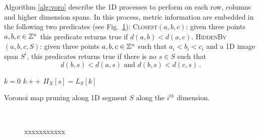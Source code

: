 \documentclass{llncs}
\begin{document}
Algorithm \ref{alg:voro} describe the 1D processes to perform on each
row, columns and higher dimension spans. In this process, metric
information are embedded in the following two predicates (see Fig.~\ref{fig:predicates}):
\textsc{Closest}$(a, b, c)$: given three points $a,b,c\in{\mathbb{Z}}^n$ this
predicate returns true if $d(a,b) < d(a,c)$. \textsc{HiddenBy}$(a, b,
c, S)$: given three points $a,b,c\in{\mathbb{Z}}^n$ such that $a_i<b_i<c_i$ and
a 1D image span $S^i$, this predicates returns true if there is no
$s\in S$ such that
    \begin{equation}
      d(b,s) < d(a,s)\text{ and }  d(b,s) < d(c,s)\,.
    \end{equation}
\begin{algorithm}[H]\footnotesize
{ $k=0$\;
}
  {
          {
            $k++$\;
          }
    $\Pi_X[s] = L_S[k]$\;
  }

  \caption{Voronoi map pruning along 1D segment $S$ along the $i^{th}$
    dimension.\label{alg:voro}}
\end{algorithm}
\begin{figure}
  \begin{center}
    ~~~~~~~~~~
  \end{center}
  \caption{xxxxxxxxxxx}
  \label{fig:predicates}
\end{figure}
\end{document}
